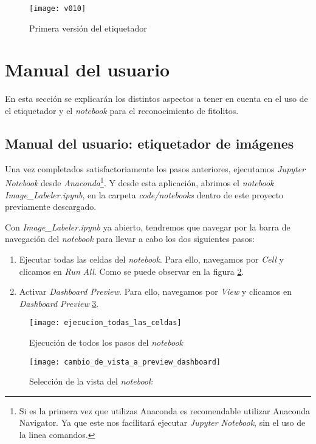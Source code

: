 \begin{figure}[h]
\centering
\texttt{[image: v010]}
\caption{Primera versión del etiquetador}
\label{fig:E.4.0}
\end{figure}

\section{Manual del usuario}

En esta sección se explicarán los distintos aspectos a tener en cuenta en el uso de el etiquetador y el \textit{notebook} para el reconocimiento de fitolitos.

\subsection{Manual del usuario: etiquetador de imágenes}
\label{iluser}
Una vez completados satisfactoriamente los pasos anteriores,  ejecutamos \textit{Jupyter Notebook} desde \textit{Anaconda}\footnote{ Si es la primera vez que utilizas Anaconda es recomendable utilizar Anaconda Navigator. Ya que este nos facilitará ejecutar \textit{Jupyter Notebook}, sin el uso de la linea comandos.}. Y desde esta aplicación, abrimos el \textit{notebook} \textit{Image\_Labeler.ipynb}, en la carpeta \textit{code/notebooks} dentro de este proyecto previamente descargado.

Con \textit{Image\_Labeler.ipynb} ya abierto, tendremos que navegar por la barra de navegación del \textit{notebook} para llevar a cabo los dos siguientes pasos:

\begin{enumerate}[1.]
    \item Ejecutar todas las celdas del \textit{notebook}.  Para ello, navegamos por \textit{Cell} y clicamos en \textit{Run All}. Como se puede observar en la figura \ref{fig:E.4.1}.
    \item Activar \textit{Dashboard Preview}. Para ello, navegamos por \textit{View} y clicamos en \textit{Dashboard Preview} \ref{fig:E.4.2}.
\end{enumerate}

\begin{figure}[h]
\centering
\texttt{[image: ejecucion\_todas\_las\_celdas]}
\caption{Ejecución de todos los pasos del \textit{notebook}}
\label{fig:E.4.1}
\end{figure}

\begin{figure}[h]
\centering
\texttt{[image: cambio\_de\_vista\_a\_preview\_dashboard]}
\caption{Selección de la vista del \textit{notebook}}
\label{fig:E.4.2}
\end{figure}

